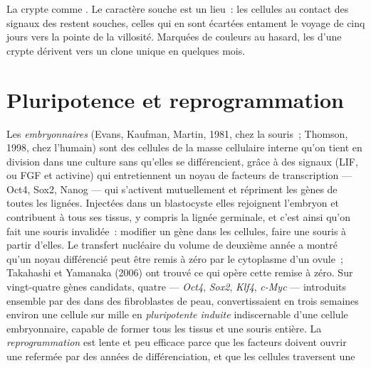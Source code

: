 \begin{omfigure}
{\small La crypte comme . Le caractère souche est un lieu~: les
cellules au contact des signaux des  restent souches,
celles qui en sont écartées entament le voyage de cinq jours vers la
pointe de la villosité. Marquées de couleurs au hasard, les  d'une crypte dérivent vers un clone unique en quelques mois.}
\end{omfigure}

\section{Pluripotence et reprogrammation}

\begin{definition}\label{def:b3:stem-cells:pluripotency}
Les \emph{ embryonnaires} (Evans, Kaufman, Martin, 1981,
chez la souris~; Thomson, 1998, chez l'humain) sont des cellules de la
masse cellulaire interne qu'on tient en division dans une culture sans
qu'elles se différencient, grâce à des signaux (LIF, ou FGF et
activine) qui entretiennent un noyau de facteurs de transcription ---
Oct4, Sox2, Nanog --- qui s'activent mutuellement et répriment les gènes
de toutes les lignées. Injectées dans un blastocyste elles rejoignent
l'embryon et contribuent à tous ses tissus, y compris la lignée
germinale, et c'est ainsi qu'on fait une souris invalidée~: modifier un
gène dans les cellules, faire une souris à partir d'elles. Le transfert
nucléaire du volume de deuxième année a montré qu'un noyau différencié
peut être remis à zéro par le cytoplasme d'un ovule~; Takahashi et
Yamanaka (2006) ont trouvé ce qui opère cette remise à zéro. Sur
vingt-quatre gènes candidats, quatre --- \emph{Oct4}, \emph{Sox2},
\emph{Klf4}, \emph{c-Myc} --- introduits ensemble par des  dans des
fibroblastes de peau, convertissaient en trois semaines environ une
cellule sur mille en \emph{ pluripotente induite}
indiscernable d'une cellule embryonnaire, capable de former tous les
tissus et une souris entière. La \emph{reprogrammation} est lente et peu
efficace parce que les facteurs doivent ouvrir une  refermée
par des années de différenciation, et que les cellules traversent une

\end{definition}
